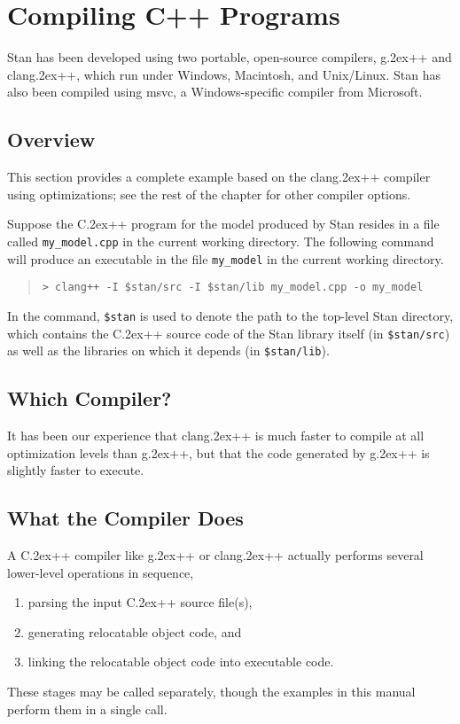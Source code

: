 \documentclass[10pt]{report}
\newcommand{\Stan}{Stan\xspace}
\newcommand*{\Cpp}{C\raise.2ex\hbox{\footnotesize ++}\xspace} %
\newcommand{\clang}{{\ttfamily clang\raise.2ex\hbox{\footnotesize ++}}\xspace}
\newcommand{\gpp}{{\ttfamily g\raise.2ex\hbox{\footnotesize ++}}\xspace}
\newcommand{\acronym}[1]{{\sc #1}\xspace}
\newcommand{\MSVC}{\acronym{msvc}}
\newcommand{\code}[1]{{\tt #1}}
\begin{document}
\chapter{Compiling C++ Programs}\label{compiling-cpp.chapter}

\Stan has been developed using two portable, open-source compilers,
\gpp and \clang, which run under Windows, Macintosh, and Unix/Linux.
\Stan has also been compiled using \MSVC, a Windows-specific compiler
from Microsoft.

\section{Overview}

This section provides a complete example based on the \clang compiler
using optimizations; see the rest of the chapter for other compiler
options.

Suppose the \Cpp program for the model produced by \Stan resides in a
file called \code{my\_model.cpp} in the current working directory.
The following command will produce an executable in the file
\code{my\_model} in the current working directory.
%
\begin{quote}
\begin{Verbatim}
> clang++ -I $stan/src -I $stan/lib my_model.cpp -o my_model
\end{Verbatim}
\end{quote}
%
In the command, \code{\$stan} is used to denote the path to the
top-level \Stan directory, which contains the \Cpp source code of the
\Stan library itself (in \code{\$stan/src}) as well as the libraries
on which it depends (in \code{\$stan/lib}).

\section{Which Compiler?}

It has been our experience that \clang is much faster to
compile at all optimization levels than \gpp, but that the code
generated by \gpp is slightly faster to execute.

\section{What the Compiler Does}

A \Cpp compiler like \gpp or \clang actually performs several
lower-level operations in sequence,
% 
\begin{enumerate}
\item
parsing the input \Cpp source file(s), 
\item 
generating relocatable object code, and
\item 
linking the relocatable object code into executable code.
\end{enumerate}
%
These stages may be called separately, though the examples in
this manual perform them in a single call.
\end{document}
